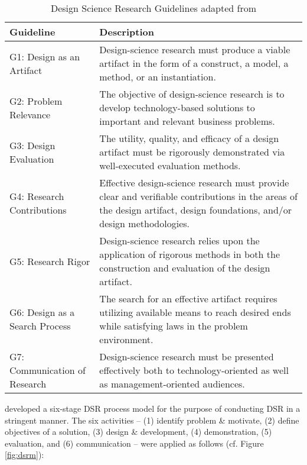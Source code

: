 \begin{table}[t]
	\centering
	\begin{tabular}{L{.25\textwidth}L{.65\textwidth}}
			\toprule 
			\small \textbf{Guideline} &\small  \textbf{Description} \\ \midrule
			\small G1: Design as an Artifact & 
			\small Design-science research must produce a viable artifact in the form of a construct, a model, a method, or an instantiation.\\ \midrule
			\small G2: Problem Relevance&
			\small The objective of design-science research is to develop technology-based solutions to important and relevant business problems.\\ \midrule
			\small G3: Design Evaluation&
			\small The utility, quality, and efficacy of a design artifact must be rigorously demonstrated via well-executed evaluation methods.\\ \midrule
			\small G4: Research Contributions&
			\small Effective design-science research must provide clear and verifiable contributions in the areas of the design artifact, design foundations, and/or design methodologies.\\ \midrule
			\small G5: Research Rigor&
			\small Design-science research relies upon the application of rigorous methods in both the construction and evaluation of the design artifact.\\ \midrule
			\small G6: Design as a Search Process&
			\small The search for an effective artifact requires utilizing available means to reach desired ends while satisfying laws in the problem environment.\\ \midrule
			\small G7: Communication of Research&
			\small Design-science research must be presented effectively both to technology-oriented as well as management-oriented audiences.\\ \bottomrule
	\end{tabular}
	\caption[Design Science Research Guidelines]{Design Science Research Guidelines adapted from \citet[p. 83]{Hevner2007}}
	\label{tab:dsrg}
\end{table}

\citet[pp. 52-56]{Peffers2007} developed a six-stage \ac{DSR} process model for the purpose of conducting \ac{DSR} in a stringent manner. The six activities -- (1) identify problem \& motivate, (2) define objectives of a solution, (3) design \& development, (4) demonstration, (5) evaluation, and (6) communication -- were applied as follows (cf. Figure \ref{fig:dsrm}):

